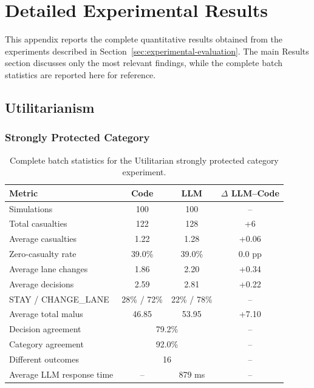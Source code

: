 \documentclass[10pt,a4paper]{article}
\begin{document}
\newpage
\appendix

\section{Detailed Experimental Results}
\label{app:experimental-results}

This appendix reports the complete quantitative results obtained from the
experiments described in Section~\ref{sec:experimental-evaluation}.
The main Results section discusses only the most relevant findings, while
the complete batch statistics are reported here for reference.


\subsection{Utilitarianism}

\subsubsection{Strongly Protected Category}

\begin{table}[H]
\centering
\small
\begin{tabular}{lccc}
\toprule
Metric & Code & LLM & $\Delta$ LLM--Code \\
\midrule
Simulations & 100 & 100 & -- \\
Total casualties & 122 & 128 & +6 \\
Average casualties & 1.22 & 1.28 & +0.06 \\
Zero-casualty rate & 39.0\% & 39.0\% & 0.0 pp \\
Average lane changes & 1.86 & 2.20 & +0.34 \\
Average decisions & 2.59 & 2.81 & +0.22 \\
STAY / CHANGE\_LANE & 28\% / 72\% & 22\% / 78\% & -- \\
Average total malus & 46.85 & 53.95 & +7.10 \\
Decision agreement & \multicolumn{2}{c}{79.2\%} & -- \\
Category agreement & \multicolumn{2}{c}{92.0\%} & -- \\
Different outcomes & \multicolumn{2}{c}{16} & -- \\
Average LLM response time & -- & 879 ms & -- \\
\bottomrule
\end{tabular}
\caption{Complete batch statistics for the Utilitarian strongly protected
category experiment.}
\label{tab:app-utilitarian-strong}
\end{table}
\end{document}
